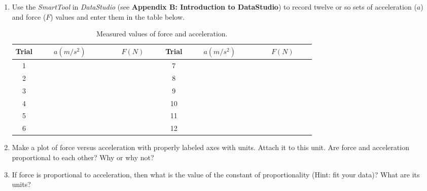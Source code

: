 \begin{enumerate}

\item Use the {\it SmartTool} in {\it DataStudio} (see {\bf Appendix B: Introduction to DataStudio}) to record twelve or
so sets of acceleration ($a$) and force ($F$) values and enter them in the table below.

\begin{center}
\begin{table}[hbt]
\begin{center}
\begin{tabular}{|c|c|c|c|c|c|}\hline
Trial & $\qquad a(m/s^2)\qquad$ & $\qquad F(N)\qquad$ & Trial & $\qquad a(m/s^2)\qquad$ & $\qquad F(N)\qquad$ \\ \hline
1     &                         &                     & 7     &                         &                     \\ \hline
2     &                         &                     & 8     &                         &                     \\ \hline
3     &                         &                     & 9     &                         &                     \\ \hline
4     &                         &                     & 10    &                         &                     \\ \hline
5     &                         &                     & 11    &                         &                     \\ \hline
6     &                         &                     & 12    &                         &                     \\ \hline
\end{tabular}
\caption{Measured values of force and acceleration.}
\end{center}
\end{table}
\end{center}

\newpage

\item Make a plot of force versus acceleration with properly labeled axes with units.
Attach it to this unit.
Are force and acceleration proportional to each other? Why or why not?

\vspace{15mm}

\item If force is proportional to acceleration, then what is the value of the constant of 
proportionality (Hint: fit your data)?
What are its units? 


\end{enumerate}
